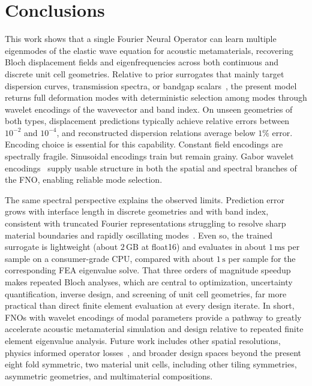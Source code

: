\documentclass[preprint,review,12pt,numafflabel]{elsarticle}
\begin{document}
\section{Conclusions}
\label{sec:Conclusion}
This work shows that a single Fourier Neural Operator can learn multiple eigenmodes of the elastic wave equation for acoustic metamaterials, recovering Bloch displacement fields and eigenfrequencies across both continuous and discrete unit cell geometries. Relative to prior surrogates that mainly target dispersion curves, transmission spectra, or bandgap scalars~\cite{Ogren2024gpr,wagner2024neural,liu2026hybridfno}, the present model returns full deformation modes with deterministic selection among modes through wavelet encodings of the wavevector and band index. On unseen geometries of both types, displacement predictions typically achieve relative errors between $10^{-2}$ and $10^{-4}$, and reconstructed dispersion relations average below $1\%$ error. Encoding choice is essential for this capability. Constant field encodings are spectrally fragile. Sinusoidal encodings train but remain grainy. Gabor wavelet encodings~\cite{gabor1946theory} supply usable structure in both the spatial and spectral branches of the FNO, enabling reliable mode selection.

The same spectral perspective explains the observed limits. Prediction error grows with interface length in discrete geometries and with band index, consistent with truncated Fourier representations struggling to resolve sharp material boundaries and rapidly oscillating modes~\cite{rahaman2019spectral,qin2024spectralfno,cavallazzi2026whno}. Even so, the trained surrogate is lightweight (about $2\,\mathrm{GB}$ at float16) and evaluates in about $1\,\mathrm{ms}$ per sample on a consumer-grade CPU, compared with about $1\,\mathrm{s}$ per sample for the corresponding FEA eigenvalue solve. That three orders of magnitude speedup makes repeated Bloch analyses, which are central to optimization, uncertainty quantification, inverse design, and screening of unit cell geometries, far more practical than direct finite element evaluation at every design iterate. In short, FNOs with wavelet encodings of modal parameters provide a pathway to greatly accelerate acoustic metamaterial simulation and design relative to repeated finite element eigenvalue analysis. Future work includes other spatial resolutions, physics informed operator losses~\cite{wang2021pidon}, and broader design spaces beyond the present eight fold symmetric, two material unit cells, including other tiling symmetries, asymmetric geometries, and multimaterial compositions.
\end{document}
